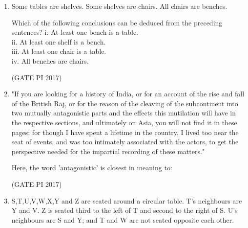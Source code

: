 \documentclass[journal,12pt,onecolumn]{IEEEtran}
\theoremstyle{remark}
\begin{document}
\begin{enumerate}
\item Some tables are shelves.  
Some shelves are chairs.  
All chairs are benches.  

Which of the following conclusions can be deduced from the preceding sentences?  
i. At least one bench is a table.  \\
ii. At least one shelf is a bench.  \\
iii. At least one chair is a table.  \\
iv. All benches are chairs.\\
\begin{enumerate}
\end{enumerate}
\hfill (GATE PI 2017)

\item "If you are looking for a history of India, or for an account of the rise and fall of the British Raj,  
or for the reason of the cleaving of the subcontinent into two mutually antagonistic parts and the effects this mutilation will have in  
the respective sections, and ultimately on Asia, you will not find it in these pages; for though I have spent a lifetime in the country,  
I lived too near the seat of events, and was too intimately associated with the actors, to get the perspective needed for the  
impartial recording of these matters." 

Here, the word 'antagonistic' is closest in meaning to:
\begin{enumerate}
\end{enumerate}
\hfill (GATE PI 2017)

\item S,T,U,V,W,X,Y and Z are seated around a circular table.  
T's neighbours are Y and V. Z is seated third to the left of T and second to the right of S. U's neighbours are S and Y;  
and T and W are not seated opposite each other.  


\end{enumerate}
\end{document}
